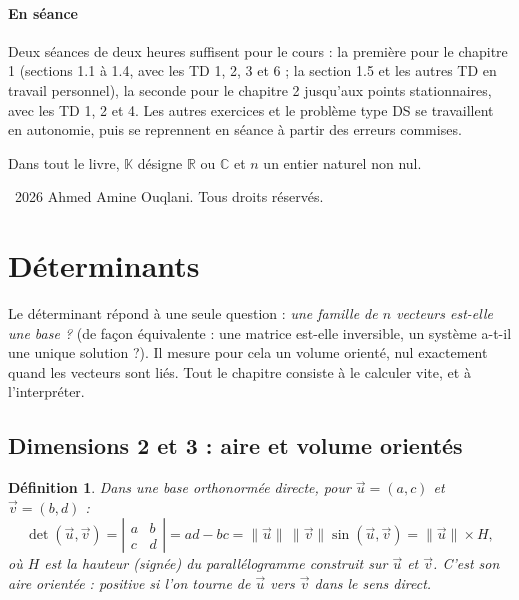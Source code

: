 \documentclass[a4paper,11pt]{article}
\numberwithin{equation}{section}
\numberwithin{figure}{section}
\numberwithin{table}{section}
\theoremstyle{enonce}
\newtheorem{definition}{Définition}[section]
\theoremstyle{exemple}
\theoremstyle{remarque}
\newcommand{\K}{\mathbb{K}}
\newcommand{\R}{\mathbb{R}}
\newcommand{\C}{\mathbb{C}}
\newcommand{\ve}[1]{\vec{#1}}
\newcommand{\dt}[1]{\left|\begin{matrix}#1\end{matrix}\right|}
\newif\ifonglets \ongletsfalse
\begin{document}
\paragraph{En séance} Deux séances de deux heures suffisent pour le cours : la première pour le chapitre 1 (sections 1.1 à
1.4, avec les TD 1, 2, 3 et 6 ; la section 1.5 et les autres TD en travail personnel), la seconde pour le chapitre 2
jusqu'aux points stationnaires, avec les TD 1, 2 et 4. Les autres exercices et le problème type DS se travaillent en
autonomie, puis se reprennent en séance à partir des erreurs commises.

Dans tout le livre, $\K$ désigne $\R$ ou $\C$ et $n$ un entier naturel non nul.

\vfill
{\footnotesize\sffamily\color{Gris}\textcopyright~2026 Ahmed Amine Ouqlani. Tous droits réservés.\par}

\clearpage
\thispagestyle{plain}
\hypertarget{toc}{}
\renewcommand{\contentsname}{Sommaire}
\tableofcontents
\clearpage
{}
\ongletstrue
\clearpage
\section{Déterminants}

Le déterminant répond à une seule question : \emph{une famille de $n$ vecteurs est-elle une base ?} (de façon équivalente :
une matrice est-elle inversible, un système a-t-il une unique solution ?). Il mesure pour cela un volume orienté, nul
exactement quand les vecteurs sont liés. Tout le chapitre consiste à le calculer vite, et à l'interpréter.

\subsection{Dimensions 2 et 3 : aire et volume orientés}

\begin{definition}
Dans une base orthonormée directe, pour $\ve u=(a,c)$ et $\ve v=(b,d)$ :
\[\det(\ve u,\ve v)=\dt{a&b\\c&d}=ad-bc=\|\ve u\|\,\|\ve v\|\sin(\ve u,\ve v)=\|\ve u\|\times H,\]
où $H$ est la hauteur (signée) du parallélogramme construit sur $\ve u$ et $\ve v$. C'est son \emph{aire orientée} :
positive si l'on tourne de $\ve u$ vers $\ve v$ dans le sens direct.
\end{definition}
\end{document}
